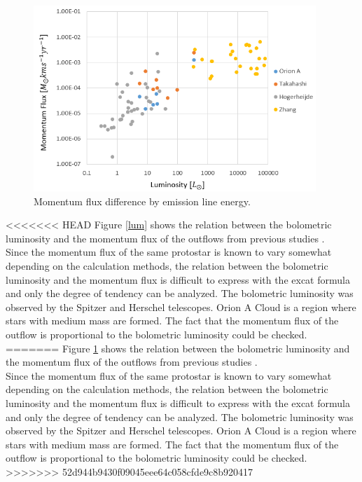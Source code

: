 \begin{figure}[h!]
	\centering
	\includegraphics[width=0.95\textwidth]{Luminosity}
	\caption{Momentum flux difference by emission line energy.}
	\label{fig:lum}
\end{figure}


<<<<<<< HEAD
Figure \ref{lum} shows the relation between the bolometric luminosity and the momentum flux of the outflows from previous studies \cite{takahashi2008millimeter, van2013outflow, hogerheijde1998envelope, nakamura2012evidence, aso2000dense, zhang2005search}. \\ Since the momentum flux of the same protostar is known to vary somewhat depending on the calculation methods\cite{van2013outflow}, the relation between the bolometric luminosity and the momentum flux is difficult to express with the excat formula and only the degree of tendency can be analyzed.
The bolometric luminosity was observed by the Spitzer and Herschel telescopes. Orion A Cloud is a region where stars with medium mass are formed. The fact that the momentum flux of the outflow is proportional to the bolometric luminosity could be checked.	
=======
Figure \ref{fig:lum} shows the relation between the bolometric luminosity and the momentum flux of the outflows from previous studies \cite{takahashi2008millimeter, van2013outflow, hogerheijde1998envelope, nakamura2012evidence, aso2000dense, zhang2005search}. \\ Since the momentum flux of the same protostar is known to vary somewhat depending on the calculation methods\cite{van2013outflow}, the relation between the bolometric luminosity and the momentum flux is difficult to express with the excat formula and only the degree of tendency can be analyzed.
The bolometric luminosity was observed by the Spitzer and Herschel telescopes. Orion A Cloud is a region where stars with medium mass are formed. The fact that the momentum flux of the outflow is proportional to the bolometric luminosity could be checked.
>>>>>>> 52d944b9430f09045eee64c058cfde9c8b920417

